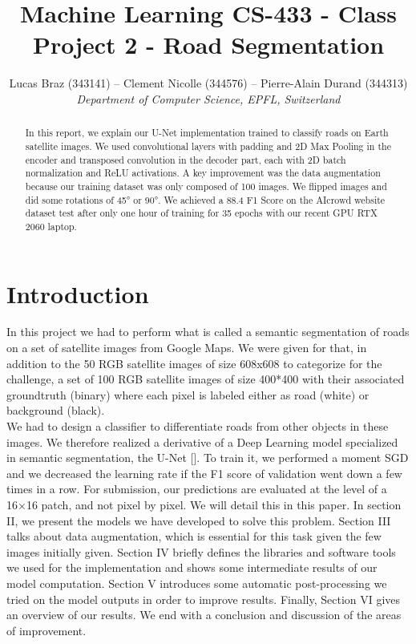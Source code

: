 \documentclass[10pt,conference,compsocconf]{IEEEtran}
\begin{document}
\pagestyle{plain}
\cleardoublepage %

\title{Machine Learning CS-433 - Class Project 2 - Road Segmentation}

\author{
  Lucas Braz (343141) -- Clement Nicolle (344576) -- Pierre-Alain Durand (344313)\\
  \textit{Department of Computer Science, EPFL, Switzerland}
}

\maketitle
\thispagestyle{plain}

\begin{abstract}
    In this report, we explain our U-Net implementation trained to classify roads on Earth satellite images. We used convolutional layers with padding and 2D Max Pooling in the encoder and transposed convolution in the decoder part, each with 2D batch normalization and ReLU activations. A key improvement was the data  augmentation because our training dataset was only composed of 100 images. We flipped images and did some rotations of 45° or 90°. We achieved a 88.4 F1 Score on the AIcrowd website dataset test after only one hour of training for 35 epochs with our recent GPU RTX 2060 laptop.
\end{abstract}
\section{Introduction}
In this project we had to perform what is called a semantic segmentation of roads on a set of satellite images from Google Maps. We were given for that, in addition to the 50 RGB satellite images of size 608x608 to categorize for the challenge, a set of 100 RGB satellite images of size 400*400 with their associated groundtruth (binary) where each pixel is labeled either as road (white) or background (black). \\
We had to design a classifier to differentiate roads from other objects in these images. We therefore realized a derivative of a Deep Learning model specialized in semantic segmentation, the U-Net [\cite{unet}]. To train it, we performed a moment SGD and we decreased the learning rate if the F1 score of validation went down a few times in a row.
For submission, our predictions are evaluated at the level of a 16×16 patch, and not pixel by pixel. We will detail this in this paper.
In section II, we present the models we have developed to solve this problem. Section III talks about data augmentation, which is essential for this task given the few images initially given. Section IV briefly defines the libraries and software tools we used for the implementation and shows some intermediate results of our model computation. Section V introduces some automatic post-processing we tried on the model outputs in order to improve results. Finally, Section VI gives an overview of our results. We end with a conclusion and discussion of the areas of improvement.
\end{document}
